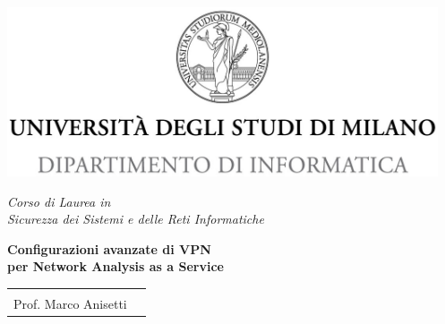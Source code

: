 \documentclass[12pt,fleqn,twoside,a4paper]{book}
\begin{document}

\begin{titlepage}
  \begin{center}
    \includegraphics[height=5.0cm]{img/minerva_2013_DI.jpg}

    \vspace*{.4cm}
    {\Large
      \emph{Corso di Laurea in\\[.3cm]
        Sicurezza dei Sistemi e delle Reti Informatiche}
    }
    \vfill
    \begin{LARGE}
      \textbf{Configurazioni avanzate di VPN \\[0.4cm]
      per Network Analysis as a Service}
    \end{LARGE}

    \vfill
    \begin{minipage}{.99\linewidth}
      \begin{tabular}{l r}
        \begin{minipage}{.4\linewidth}
          \begin{flushleft}
            {\large
              RELATORE\\[.3cm]
              Prof. Marco Anisetti
            }


\end{flushleft}
\end{minipage}
\end{tabular}
\end{minipage}
\end{center}
\end{titlepage}
\end{document}
